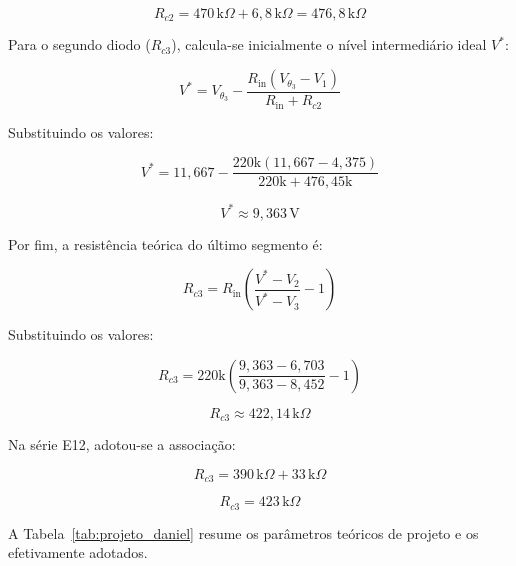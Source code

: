 \documentclass[11pt,a4paper]{article}
\begin{document}
\begin{itemize}
    \[
    R_{c2}=470\,\text{k}\Omega+6{,}8\,\text{k}\Omega
    =476{,}8\,\text{k}\Omega
    \]

    Para o segundo diodo ($R_{c3}$), calcula-se inicialmente
    o nível intermediário ideal $V^*$:

    \[
    V^*=V_{\theta_3}-
    \frac{R_{\text{in}}(V_{\theta_3}-V_1)}
    {R_{\text{in}}+R_{c2}}
    \]

    Substituindo os valores:

    \[
    V^*=11{,}667-
    \frac{220\text{k}(11{,}667-4{,}375)}
    {220\text{k}+476{,}45\text{k}}
    \]

    \[
    \boxed{V^*\approx9{,}363\,\text{V}}
    \]

    Por fim, a resistência teórica do último segmento é:

    \[
    R_{c3}=R_{\text{in}}
    \left(
    \frac{V^*-V_2}{V^*-V_3}-1
    \right)
    \]

    Substituindo os valores:

    \[
    R_{c3}=220\text{k}
    \left(
    \frac{9{,}363-6{,}703}
    {9{,}363-8{,}452}-1
    \right)
    \]

    \[
    \boxed{R_{c3}\approx422{,}14\,\text{k}\Omega}
    \]

    Na série E12, adotou-se a associação:

    \[
    R_{c3}=390\,\text{k}\Omega+33\,\text{k}\Omega
    \]

    \[
    \boxed{R_{c3}=423\,\text{k}\Omega}
    \]

\end{itemize}

A Tabela~\ref{tab:projeto_daniel} resume os parâmetros teóricos de projeto e os
efetivamente adotados.
\end{document}
